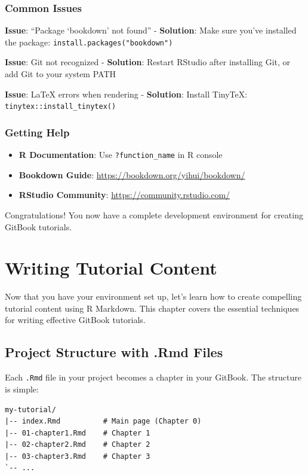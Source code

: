 \documentclass[
]{book}
\providecommand{\tightlist}{%
  \setlength{\itemsep}{0pt}\setlength{\parskip}{0pt}}
\begin{document}
\subsection{Common Issues}\label{common-issues}

\textbf{Issue}: ``Package `bookdown' not found''
- \textbf{Solution}: Make sure you've installed the package: \texttt{install.packages("bookdown")}

\textbf{Issue}: Git not recognized
- \textbf{Solution}: Restart RStudio after installing Git, or add Git to your system PATH

\textbf{Issue}: LaTeX errors when rendering
- \textbf{Solution}: Install TinyTeX: \texttt{tinytex::install\_tinytex()}

\subsection{Getting Help}\label{getting-help}

\begin{itemize}
\tightlist
\item
  \textbf{R Documentation}: Use \texttt{?function\_name} in R console
\item
  \textbf{Bookdown Guide}: \url{https://bookdown.org/yihui/bookdown/}
\item
  \textbf{RStudio Community}: \url{https://community.rstudio.com/}
\end{itemize}

Congratulations! You now have a complete development environment for creating GitBook tutorials.

\chapter{Writing Tutorial Content}\label{content}

Now that you have your environment set up, let's learn how to create compelling tutorial content using R Markdown. This chapter covers the essential techniques for writing effective GitBook tutorials.

\section{Project Structure with .Rmd Files}\label{project-structure-with-.rmd-files}

Each \texttt{.Rmd} file in your project becomes a chapter in your GitBook. The structure is simple:

\begin{verbatim}
my-tutorial/
|-- index.Rmd          # Main page (Chapter 0)
|-- 01-chapter1.Rmd    # Chapter 1
|-- 02-chapter2.Rmd    # Chapter 2
|-- 03-chapter3.Rmd    # Chapter 3
`-- ...
\end{verbatim}
\end{document}
